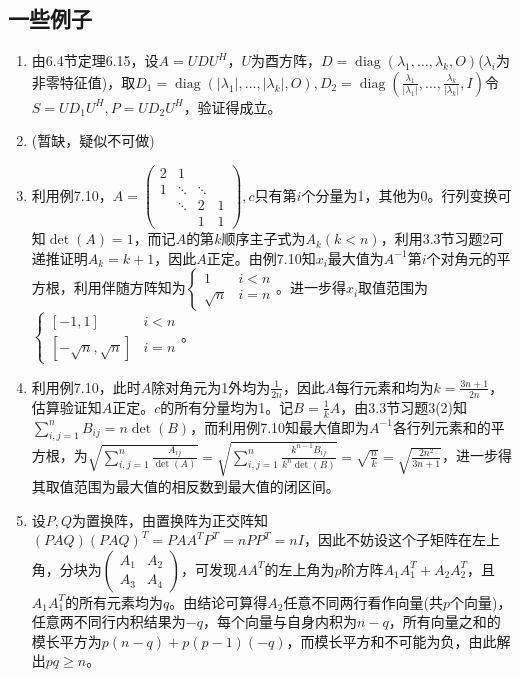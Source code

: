 \documentclass[a4paper,UTF8,fontset=windows]{ctexart}
\DeclareMathOperator{\diag}{diag}
\begin{document}
\subsection{一些例子}
\begin{enumerate}
\item
由6.4节定理6.15，设$A=UDU^H$，$U$为酉方阵，$D=\diag(\lambda_1,\dots,\lambda_k,O)$($\lambda_i$为非零特征值)，取$D_1=\diag(|\lambda_1|,\dots,|\lambda_k|,O),D_2=\diag(\frac{\lambda_1}{|\lambda_1|},\dots,\frac{\lambda_k}{|\lambda_k|},I)$令$S=UD_1U^H,P=UD_2U^H$，验证得成立。

\item
(暂缺，疑似不可做)

\item
利用例7.10，$A=\begin{pmatrix}2&1&&\\1&\ddots&\ddots&\\&\ddots&2&1\\&&1&1\end{pmatrix},c$只有第$i$个分量为1，其他为0。行列变换可知$\det(A)=1$，而记$A$的第$k$顺序主子式为$A_k(k<n)$，利用3.3节习题2可递推证明$A_k=k+1$，因此$A$正定。由例7.10知$x_i$最大值为$A^{-1}$第$i$个对角元的平方根，利用伴随方阵知为$\begin{cases}1&i<n\\\sqrt{n}&i=n\end{cases}$。进一步得$x_i$取值范围为$\begin{cases}[-1,1]&i<n\\ [-\sqrt{n},\sqrt{n}]&i=n\end{cases}$。

\item
利用例7.10，此时$A$除对角元为1外均为$\frac{1}{2n}$，因此$A$每行元素和均为$k=\frac{3n+1}{2n}$，估算验证知$A$正定。$c$的所有分量均为1。记$B=\frac{1}{k}A$，由3.3节习题3(2)知$\sum_{i,j=1}^nB_{ij}=n\det(B)$，而利用例7.10知最大值即为$A^{-1}$各行列元素和的平方根，为$\sqrt{\sum_{i,j=1}^n\frac{A_{ij}}{\det(A)}}=\sqrt{\sum_{i,j=1}^n\frac{k^{n-1}B_{ij}}{k^n\det(B)}}=\sqrt{\frac{n}{k}}=\sqrt{\frac{2n^2}{3n+1}}$，进一步得其取值范围为最大值的相反数到最大值的闭区间。

\item
设$P,Q$为置换阵，由置换阵为正交阵知$(PAQ)(PAQ)^T=PAA^TP^T=nPP^T=nI$，因此不妨设这个子矩阵在左上角，分块为$\begin{pmatrix}A_1&A_2\\A_3&A_4\end{pmatrix}$，可发现$AA^T$的左上角为$p$阶方阵$A_1A_1^T+A_2A_2^T$，且$A_1A_1^T$的所有元素均为$q$。由结论可算得$A_2$任意不同两行看作向量(共$p$个向量)，任意两不同行内积结果为$-q$，每个向量与自身内积为$n-q$，所有向量之和的模长平方为$p(n-q)+p(p-1)(-q)$，而模长平方和不可能为负，由此解出$pq\ge n$。


\end{enumerate}
\end{document}
